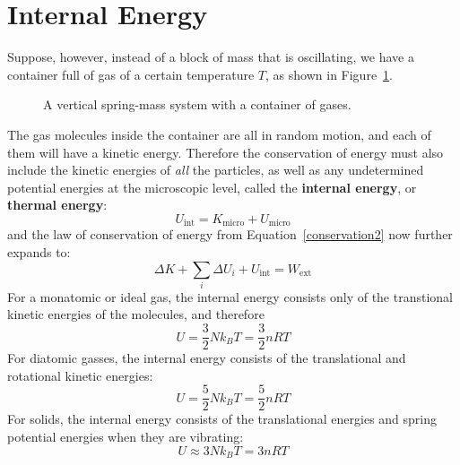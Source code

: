 \documentclass[11pt]{article}
\begin{document}
\section{Internal Energy}
Suppose, however, instead of a block of mass that is oscillating, we have a
container full of gas of a certain temperature $T$, as shown in Figure~\ref{vertical}.
\begin{figure}[ht]
  \centering
  \caption{A vertical spring-mass system with a container of gases.}
  \label{vertical}
\end{figure}
 The
gas molecules inside the container are all in random motion, and each of them
will have a kinetic energy. Therefore the conservation of energy must also
include the kinetic energies of \emph{all} the particles, as well as any undetermined
potential energies at the microscopic level, called the
\textbf{internal energy}, or \textbf{thermal energy}:
\begin{equation}
  U_\text{int} = K_\text{micro} + U_\text{micro}
\end{equation}
and the law of conservation of energy from Equation~\ref{conservation2} now
further expands to:
\begin{equation}
  \boxed{ \Delta K + \sum_i\Delta U_i + U_\text{int}= W_\text{ext}}
  \label{conservation3}
\end{equation}
For a monatomic or ideal gas, the internal energy consists only of the
transtional kinetic energies of the molecules, and therefore
\begin{equation}
  U=\frac32Nk_BT=\frac32nRT
\end{equation}
For diatomic gasses, the internal energy consists of the translational and
rotational kinetic energies:
\begin{equation}
  U=\frac52Nk_BT=\frac52nRT
\end{equation}
For solids, the internal energy consists of the translational energies and
spring potential energies when they are vibrating:
\begin{equation}
  U\approx3Nk_BT=3nRT
  \label{eq:solidU}
\end{equation}
\end{document}
